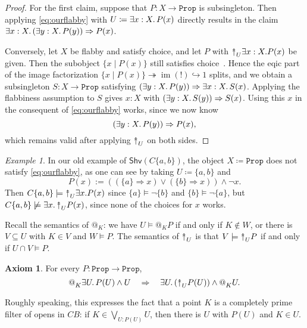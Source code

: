 \documentclass[11pt, oneside, article]{memoir}
\makeatletter
\theoremstyle{plain}
\theoremstyle{definition}
\newtheorem{axiom}{Axiom}
\theoremstyle{remark}
\newtheorem{example}[theorem]{Example}
\DeclareMathOperator{\im}{im}
\newcommand{\const}[1]{\mathtt{#1}}
\newcommand{\Fun}[1]{\mathsf{#1}}
\newcommand{\Shv}{\Fun{Shv}}
\newcommand{\Prop}{\const{Prop}}
\newcommand{\BaseSpace}{B}
\newcommand{\AtSymbol}{{@}}
\newcommand{\InSymbol}{{\upclose}}%
\newcommand{\At}[2][]{\AtSymbol^{#1}_{#2}}
\newcommand{\In}[2][]{\InSymbol^{#1}_{#2}}
\newcommand{\upclose}{{\rotatebox[origin=c]{90}{$\twoheadrightarrow$}}}
\newcommand{\imp}{\Rightarrow}
\makeatother
\begin{document}
\begin{proof}
For the first claim, suppose that $P : X \to \Prop$ is subsingleton. Then applying \cref{eq:ourflabby} with $U \coloneqq \exists x : X \ldotp P(x)$ directly results in the claim $\exists x : X\ldotp (\exists y : X\ldotp P(y)) \imp P(x)$.

Conversely, let $X$ be flabby and satisfy choice, and let $P$ with $\In{U} \exists x : X. P(x)$ be given. Then the subobject $\{ x \mid P(x) \}$ still satisfies choice~\cite[Lemma D.4.5.9]{Johnstone:2002a}. Hence the eqic part of the image factorization $\{ x \mid P(x) \} \twoheadrightarrow \im(!) \hookrightarrow 1$ splits, and we obtain a subsingleton $S : X\to\Prop$ satisfying $(\exists y : X\ldotp P(y)) \imp \exists x : X\ldotp S(x)$. Applying the flabbiness assumption to $S$ gives $x : X$ with $(\exists y : X\ldotp S(y)) \imp S(x)$. Using this $x$ in the consequent of \cref{eq:ourflabby} works, since we now know
\[
	(\exists y : X\ldotp P(y)) \imp P(x),
\]
which remains valid after applying $\In{U}$ on both sides.
\end{proof}

\begin{example}
In our old example of $\Shv(C\{a,b\})$, the object $X \coloneqq \Prop$ does not satisfy \eqref{eq:ourflabby}, as one can see by taking $U \coloneqq \{a,b\}$ and
\[
	P(x) := ((\{a\}\imp x) \vee (\{b\}\imp x)) \wedge \neg x.
\]
Then $C\{a,b\} \models \In{U} \exists x. P(x)$ since $\{a\} \models \neg \{b\}$ and $\{b\} \models \neg \{a\}$, but $C\{a,b\} \not\models \exists x\ldotp \In{U} P(x)$, since none of the choices for $x$ works.
\end{example}

Recall the semantics of $\At{K}$: we have $U \models \At{K} P$ if and only if $K \not\in W$, or there is $V\subseteq U$ with $K\in V$ and $W \models P$. The semantics of $\In{U}$ is that $V \models \In{U} P$ if and only if $U \cap V \models P$.

\begin{axiom}\label{axiom:completely_prime}
For every $P : \Prop \to \Prop$,
\[
	\At{K} \exists U\ldotp P(U) \wedge U \quad \imp \quad \exists U\ldotp (\In{U} P(U)) \wedge \At{K} U.
\]
\end{axiom}

Roughly speaking, this expresses the fact that a point $K$ is a completely prime filter of opens in $C\BaseSpace$: if $K\in \bigvee_{U : P(U)} U$, then there is $U$ with $P(U)$ and $K\in U$.
\end{document}

